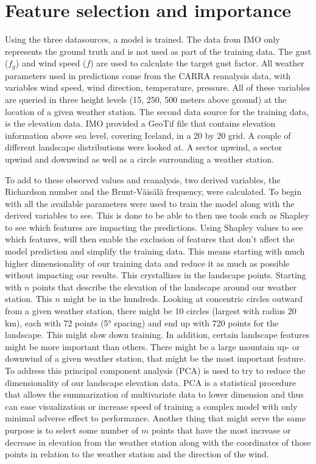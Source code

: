 \section{Feature selection and importance}
Using the three datasources, a model is trained. The data from IMO only represents the ground truth and is not used as part of the training data. The gust ($f_g$) and wind speed ($f$) are used to calculate the target gust factor. All weather parameters used in predictions come from the CARRA reanalysis data, with variables wind speed, wind direction, temperature, pressure. All of these variables are queried in three height levels (15, 250, 500 meters above ground) at the location of a given weather station. The second data source for the training data, is the elevation data. IMO provided a GeoTif file that contains elevation information above sea level, covering Iceland, in a 20 by 20 grid. A couple of different landscape distributions were looked at. A sector upwind, a sector upwind and downwind as well as a circle surrounding a weather station.

To add to these observed values and reanalysis, two derived variables, the Richardson number and the Brunt-Väisälä frequency, were calculated. To begin with all the available parameters were used to train the model along with the derived variables to see. This is done to be able to then use tools such as Shapley to see which features are impacting the predictions. Using Shapley values to see which features, will then enable the exclusion of features that don't affect the model prediction and simplify the training data. This means starting with much higher dimensionality of our training data and reduce it as much as possible without impacting our results. This crystallizes in the landscape points. Starting with $n$ points that describe the elevation of the landscape around our weather station. This $n$ might be in the hundreds. Looking at concentric circles outward from a given weather station, there might be 10 circles (largest with radius 20 km), each with 72 points (5° spacing) and end up with 720 points for the landscape. This might slow down training. In addition, certain landscape features might be more important than others. There might be a large mountain up- or downwind of a given weather station, that might be the most important feature. To address this principal component analysis (PCA) is used to try to reduce the dimensionality of our landscape elevation data. PCA is a statistical procedure that allows the summarization of multivariate data to lower dimension and thus can ease visualization or increase speed of training a complex model with only minimal adverse effect to performance\cite{pca_information}. Another thing that might serve the same purpose is to select some number of $m$ points that have the most increase or decrease in elevation from the weather station along with the coordinates of those points in relation to the weather station and the direction of the wind.

